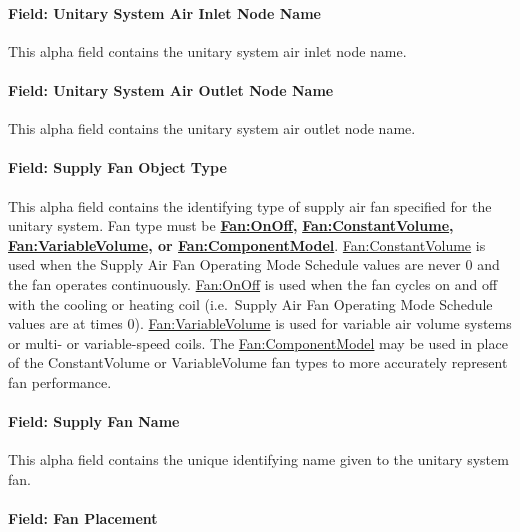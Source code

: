 \paragraph{Field: Unitary System Air Inlet Node Name}\label{field-unitary-system-air-inlet-node-name}

This alpha field contains the unitary system air inlet node name.

\paragraph{Field: Unitary System Air Outlet Node Name}\label{field-unitary-system-air-outlet-node-name}

This alpha field contains the unitary system air outlet node name.

\paragraph{Field: Supply Fan Object Type}\label{field-supply-fan-object-type-000}

This alpha field contains the identifying type of supply air fan specified for the unitary system. Fan type must be \textbf{\hyperref[fanonoff]{Fan:OnOff},} \textbf{\hyperref[fanconstantvolume]{Fan:ConstantVolume}, \hyperref[fanvariablevolume]{Fan:VariableVolume}, or \hyperref[fancomponentmodel]{Fan:ComponentModel}}. \hyperref[fanconstantvolume]{Fan:ConstantVolume} is used when the Supply Air Fan Operating Mode Schedule values are never 0 and the fan operates continuously. \hyperref[fanonoff]{Fan:OnOff} is used when the fan cycles on and off with the cooling or heating coil (i.e.~Supply Air Fan Operating Mode Schedule values are at times 0). \hyperref[fanvariablevolume]{Fan:VariableVolume} is used for variable air volume systems or multi- or variable-speed coils. The \hyperref[fancomponentmodel]{Fan:ComponentModel} may be used in place of the ConstantVolume or VariableVolume fan types to more accurately represent fan performance.

\paragraph{Field: Supply Fan Name}\label{field-supply-fan-name}

This alpha field contains the unique identifying name given to the unitary system fan.

\paragraph{Field: Fan Placement}\label{field-fan-placement}

